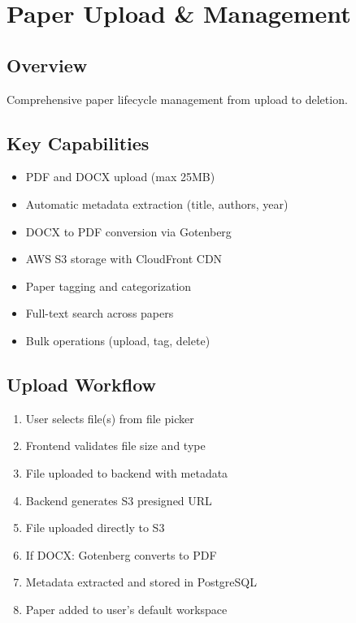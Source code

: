 \section{Paper Upload \& Management}
\label{sec:feature-paper-management}

\subsection{Overview}

Comprehensive paper lifecycle management from upload to deletion.

\subsection{Key Capabilities}

\begin{itemize}[leftmargin=*]
    \item PDF and DOCX upload (max 25MB)
    \item Automatic metadata extraction (title, authors, year)
    \item DOCX to PDF conversion via Gotenberg
    \item AWS S3 storage with CloudFront CDN
    \item Paper tagging and categorization
    \item Full-text search across papers
    \item Bulk operations (upload, tag, delete)
\end{itemize}

\subsection{Upload Workflow}

\begin{enumerate}[leftmargin=*]
    \item User selects file(s) from file picker
    \item Frontend validates file size and type
    \item File uploaded to backend with metadata
    \item Backend generates S3 presigned URL
    \item File uploaded directly to S3
    \item If DOCX: Gotenberg converts to PDF
    \item Metadata extracted and stored in PostgreSQL
    \item Paper added to user's default workspace
\end{enumerate}

